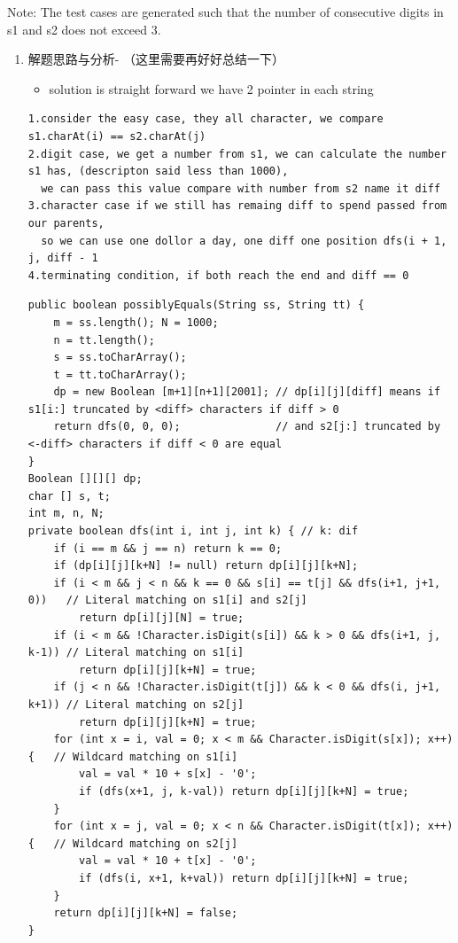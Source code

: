 \documentclass[9pt, b5paaper]{book}
\begin{document}
Note: The test cases are generated such that the number of consecutive digits in s1 and s2 does not exceed 3.
\begin{enumerate}
\item 解题思路与分析- （这里需要再好好总结一下）
\label{sec-1-0-5-1}
\begin{itemize}
\item solution is straight forward we have 2 pointer in each string
\end{itemize}
\begin{verbatim}
1.consider the easy case, they all character, we compare s1.charAt(i) == s2.charAt(j)
2.digit case, we get a number from s1, we can calculate the number s1 has, (descripton said less than 1000), 
  we can pass this value compare with number from s2 name it diff
3.character case if we still has remaing diff to spend passed from our parents, 
  so we can use one dollor a day, one diff one position dfs(i + 1, j, diff - 1
4.terminating condition, if both reach the end and diff == 0
\end{verbatim}

\begin{verbatim}
public boolean possiblyEquals(String ss, String tt) {
    m = ss.length(); N = 1000;
    n = tt.length();
    s = ss.toCharArray();
    t = tt.toCharArray();
    dp = new Boolean [m+1][n+1][2001]; // dp[i][j][diff] means if s1[i:] truncated by <diff> characters if diff > 0 
    return dfs(0, 0, 0);               // and s2[j:] truncated by <-diff> characters if diff < 0 are equal
}
Boolean [][][] dp;
char [] s, t;
int m, n, N;
private boolean dfs(int i, int j, int k) { // k: dif
    if (i == m && j == n) return k == 0;
    if (dp[i][j][k+N] != null) return dp[i][j][k+N];
    if (i < m && j < n && k == 0 && s[i] == t[j] && dfs(i+1, j+1, 0))   // Literal matching on s1[i] and s2[j]
        return dp[i][j][N] = true;
    if (i < m && !Character.isDigit(s[i]) && k > 0 && dfs(i+1, j, k-1)) // Literal matching on s1[i]
        return dp[i][j][k+N] = true;
    if (j < n && !Character.isDigit(t[j]) && k < 0 && dfs(i, j+1, k+1)) // Literal matching on s2[j]
        return dp[i][j][k+N] = true;
    for (int x = i, val = 0; x < m && Character.isDigit(s[x]); x++) {   // Wildcard matching on s1[i]
        val = val * 10 + s[x] - '0';
        if (dfs(x+1, j, k-val)) return dp[i][j][k+N] = true;
    }
    for (int x = j, val = 0; x < n && Character.isDigit(t[x]); x++) {   // Wildcard matching on s2[j]
        val = val * 10 + t[x] - '0';
        if (dfs(i, x+1, k+val)) return dp[i][j][k+N] = true;
    }
    return dp[i][j][k+N] = false;
}
\end{verbatim}
\end{enumerate}
\end{document}
